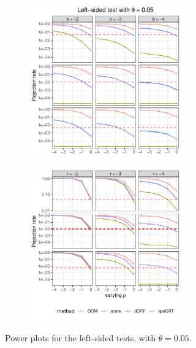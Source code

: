 \documentclass[12pt]{article}
\theoremstyle{definition}
\begin{document}
\begin{figure}
  \centering

  \begin{subfigure}{\textwidth}
    \centering
    \includegraphics[width=0.72\textwidth]{figures-and-tables/simulation/power/plot-bin-NB-normal-B-50000-n-5000-5e3-n5-n5-disp-5e-2-power-fixed-gamma-LEFT.pdf}
  \end{subfigure}

  \begin{subfigure}{\textwidth}
    \centering
    \includegraphics[width=0.72\textwidth]{figures-and-tables/simulation/power/plot-bin-NB-normal-B-50000-n-5000-5e3-n5-n5-disp-5e-2-power-fixed-beta-LEFT.pdf}
  \end{subfigure}

  \caption{Power plots for the left-sided tests, with $\theta = 0.05$.}
  \label{fig:simulation-power-LEFT-0.05}
\end{figure}
\end{document}
